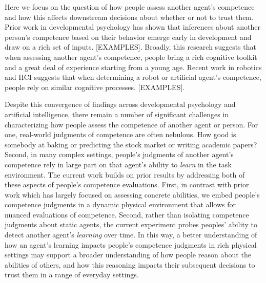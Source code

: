 \documentclass[10pt,letterpaper]{article}
\begin{document}
Here we focus on the question of how people assess another agent's competence and how this affects downstream decisions about whether or not to trust them. Prior work in developmental psychology has shown that inferences about another person's competence based on their behavior emerge early in development and draw on a rich set of inputs. [EXAMPLES]. Broadly, this research suggests that when assessing another agent's competence, people bring a rich cognitive toolkit and a great deal of experience starting from a young age. Recent work in robotics and HCI suggests that when determining a robot or artificial agent's competence, people rely on similar cognitive processes. [EXAMPLES]. 

Despite this convergence of findings across developmental psychology and artificial intelligence, there remain a number of significant challenges in characterizing how people assess the competence of another agent or person. For one, real-world judgments of competence are often nebulous. How good is somebody at baking or predicting the stock market or writing academic papers? Second, in many complex settings, people's judgments of another agent's competence rely in large part on that agent's ability to \textit{learn} in the task environment. The current work builds on prior results by addressing both of these aspects of people's competence evaluations. First, in contrast with prior work which has largely focused on assessing concrete abilities, we embed people's competence judgments in a dynamic physical environment that allows for nuanced evaluations of competence. Second, rather than isolating competence judgments about static agents, the current experiment probes peoples' ability to detect another agent's \textit{learning} over time. In this way, a better understanding of how an agent's learning impacts people's competence judgments in rich physical settings may support a broader understanding of how people reason about the abilities of others, and how this reasoning impacts their subsequent decisions to trust them in a range of everyday settings.
\end{document}
